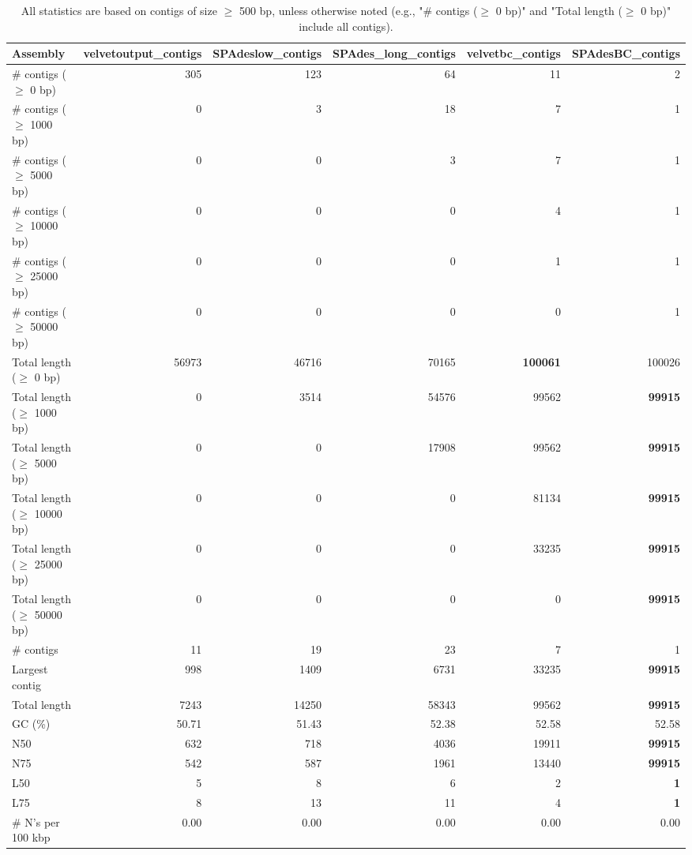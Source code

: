 \documentclass[12pt,a4paper]{article}
\begin{document}
\begin{table}[ht]
\begin{center}
\caption{All statistics are based on contigs of size $\geq$ 500 bp, unless otherwise noted (e.g., "\# contigs ($\geq$ 0 bp)" and "Total length ($\geq$ 0 bp)" include all contigs).}
\begin{tabular}{|l*{5}{|r}|}
\hline
Assembly & velvetoutput\_contigs & SPAdeslow\_contigs & SPAdes\_long\_contigs & velvetbc\_contigs & SPAdesBC\_contigs \\ \hline
\# contigs ($\geq$ 0 bp) & 305 & 123 & 64 & 11 & 2 \\ \hline
\# contigs ($\geq$ 1000 bp) & 0 & 3 & 18 & 7 & 1 \\ \hline
\# contigs ($\geq$ 5000 bp) & 0 & 0 & 3 & 7 & 1 \\ \hline
\# contigs ($\geq$ 10000 bp) & 0 & 0 & 0 & 4 & 1 \\ \hline
\# contigs ($\geq$ 25000 bp) & 0 & 0 & 0 & 1 & 1 \\ \hline
\# contigs ($\geq$ 50000 bp) & 0 & 0 & 0 & 0 & 1 \\ \hline
Total length ($\geq$ 0 bp) & 56973 & 46716 & 70165 & {\bf 100061} & 100026 \\ \hline
Total length ($\geq$ 1000 bp) & 0 & 3514 & 54576 & 99562 & {\bf 99915} \\ \hline
Total length ($\geq$ 5000 bp) & 0 & 0 & 17908 & 99562 & {\bf 99915} \\ \hline
Total length ($\geq$ 10000 bp) & 0 & 0 & 0 & 81134 & {\bf 99915} \\ \hline
Total length ($\geq$ 25000 bp) & 0 & 0 & 0 & 33235 & {\bf 99915} \\ \hline
Total length ($\geq$ 50000 bp) & 0 & 0 & 0 & 0 & {\bf 99915} \\ \hline
\# contigs & 11 & 19 & 23 & 7 & 1 \\ \hline
Largest contig & 998 & 1409 & 6731 & 33235 & {\bf 99915} \\ \hline
Total length & 7243 & 14250 & 58343 & 99562 & {\bf 99915} \\ \hline
GC (\%) & 50.71 & 51.43 & 52.38 & 52.58 & 52.58 \\ \hline
N50 & 632 & 718 & 4036 & 19911 & {\bf 99915} \\ \hline
N75 & 542 & 587 & 1961 & 13440 & {\bf 99915} \\ \hline
L50 & 5 & 8 & 6 & 2 & {\bf 1} \\ \hline
L75 & 8 & 13 & 11 & 4 & {\bf 1} \\ \hline
\# N's per 100 kbp & 0.00 & 0.00 & 0.00 & 0.00 & 0.00 \\ \hline
\end{tabular}
\end{center}
\end{table}
\end{document}
